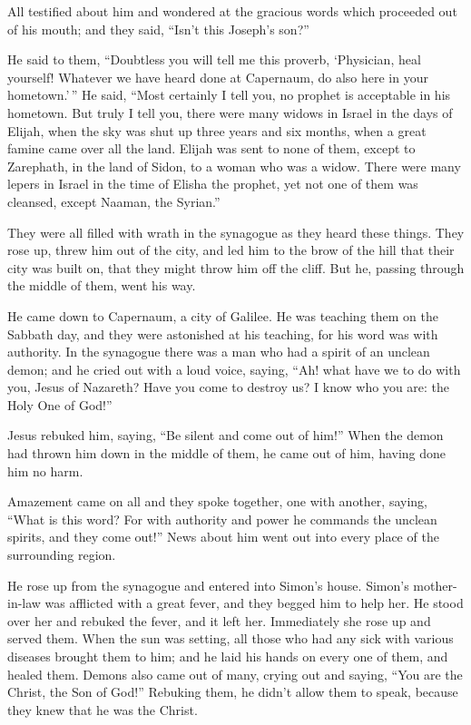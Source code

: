  All testified about him and wondered at the gracious words
which proceeded out of his mouth; and they said, ``Isn't this Joseph's
son?''

 He said to them, ``Doubtless you will tell me this
proverb, `Physician, heal yourself! Whatever we have heard done at
Capernaum, do also here in your hometown.'\,''  He said,
``Most certainly I tell you, no prophet is acceptable in his hometown.
 But truly I tell you, there were many widows in Israel in
the days of Elijah, when the sky was shut up three years and six months,
when a great famine came over all the land.  Elijah was
sent to none of them, except to Zarephath, in the land of Sidon, to a
woman who was a widow.  There were many lepers in Israel in
the time of Elisha the prophet, yet not one of them was cleansed, except
Naaman, the Syrian.''

 They were all filled with wrath in the synagogue as they
heard these things.  They rose up, threw him out of the
city, and led him to the brow of the hill that their city was built on,
that they might throw him off the cliff.  But he, passing
through the middle of them, went his way.

 He came down to Capernaum, a city of Galilee. He was
teaching them on the Sabbath day,  and they were astonished
at his teaching, for his word was with authority.  In the
synagogue there was a man who had a spirit of an unclean demon; and he
cried out with a loud voice,  saying, ``Ah! what have we to
do with you, Jesus of Nazareth? Have you come to destroy us? I know who
you are: the Holy One of God!''

 Jesus rebuked him, saying, ``Be silent and come out of
him!'' When the demon had thrown him down in the middle of them, he came
out of him, having done him no harm.

 Amazement came on all and they spoke together, one with
another, saying, ``What is this word? For with authority and power he
commands the unclean spirits, and they come out!''  News
about him went out into every place of the surrounding region.

 He rose up from the synagogue and entered into Simon's
house. Simon's mother-in-law was afflicted with a great fever, and they
begged him to help her.  He stood over her and rebuked the
fever, and it left her. Immediately she rose up and served them.
 When the sun was setting, all those who had any sick with
various diseases brought them to him; and he laid his hands on every one
of them, and healed them.  Demons also came out of many,
crying out and saying, ``You are the Christ, the Son of God!'' Rebuking
them, he didn't allow them to speak, because they knew that he was the
Christ.

